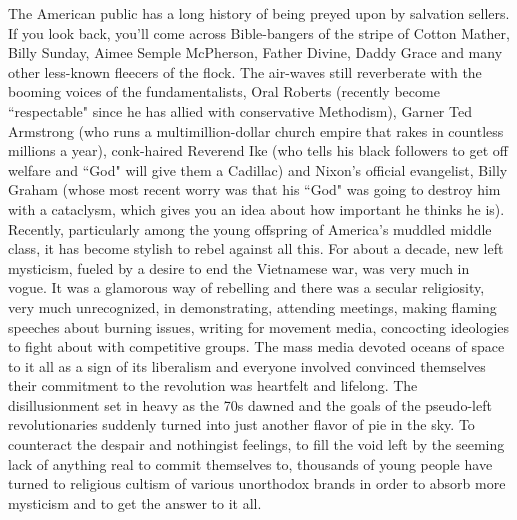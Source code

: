 \documentclass[12pt, onecolumn, letterpaper, oneside]{book}
\begin{document}
The American public has a long history of being preyed upon by salvation sellers. If you look back, you'll come across Bible-bangers of the stripe of Cotton Mather, Billy Sunday, Aimee Semple McPherson, Father Divine, Daddy Grace and many other less-known fleecers of the flock. The air-waves still reverberate with the booming voices of the fundamentalists, Oral Roberts (recently become ``respectable" since he has allied with conservative Methodism), Garner Ted Armstrong (who runs a multimillion-dollar church empire that rakes in countless millions a year), conk-haired Reverend Ike (who tells his black followers to get off welfare and ``God" will give them a Cadillac) and Nixon's official evangelist, Billy Graham (whose most recent worry was that his ``God" was going to destroy him with a cataclysm, which gives you an idea about how important he thinks he is).\\
Recently, particularly among the young offspring of America's muddled middle class, it has become stylish to rebel against all this. For about a decade, new left mysticism, fueled by a desire to end the Vietnamese war, was very much in vogue. It was a glamorous way of rebelling and there was a secular religiosity, very much unrecognized, in demonstrating, attending meetings, making flaming speeches about burning issues, writing for movement media, concocting ideologies to fight about with competitive groups. The mass media devoted oceans of space to it all as a sign of its liberalism and everyone involved convinced themselves their commitment to the revolution was heartfelt and lifelong. The disillusionment set in heavy as the 70s dawned and the goals of the pseudo-left revolutionaries suddenly turned into just another flavor of pie in the sky. To counteract the despair and nothingist feelings, to fill the void left by the seeming lack of anything real to commit themselves to, thousands of young people have turned to religious cultism of various unorthodox brands in order to absorb more mysticism and to get the answer to it all.\\
\end{document}
